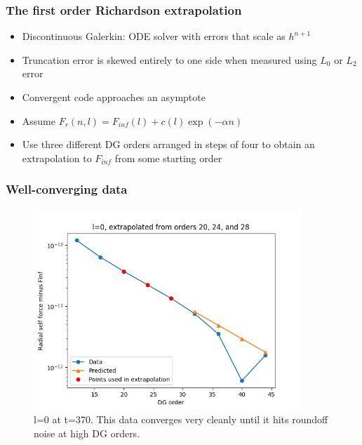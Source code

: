 \documentclass{beamer}
\begin{document}
\begin{frame}
  \frametitle{The first order Richardson extrapolation}
  \begin{itemize}
  \item Discontinuous Galerkin: ODE solver with errors that scale as $h^{n+1}$
  \item Truncation error is skewed entirely to one side when measured using $L_0$ or $L_2$ error
  \item Convergent code approaches an asymptote
  \item Assume $F_r(n,l)=F_{inf}(l)+c(l)\exp(-\alpha n)$
  \item Use three different DG orders arranged in steps of four to obtain an extrapolation to $F_{inf}$ from some starting order
   \end{itemize}
\end{frame}

\begin{frame}
  \frametitle{Well-converging data}
  \begin{figure}
  \includegraphics[width=0.9\textwidth]{fittingtechniqet370l0}
  \caption{l=0 at t=370. This data converges very cleanly until it hits roundoff noise at high DG orders.}
  \end{figure}
\end{frame}
  
\end{document}
